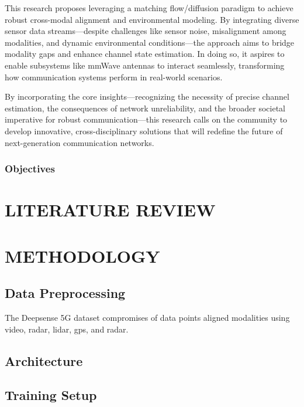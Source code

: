 \documentclass{UCF_ETD}
\begin{document}
This research proposes leveraging a matching flow/diffusion paradigm to achieve robust cross-modal alignment and environmental modeling. By integrating diverse sensor data streams—despite challenges like sensor noise, misalignment among modalities, and dynamic environmental conditions—the approach aims to bridge modality gaps and enhance channel state estimation. In doing so, it aspires to enable subsystems like mmWave antennas to interact seamlessly, transforming how communication systems perform in real-world scenarios.

By incorporating the core insights—recognizing the necessity of precise channel estimation, the consequences of network unreliability, and the broader societal imperative for robust communication—this research calls on the community to develop innovative, cross-disciplinary solutions that will redefine the future of next-generation communication networks.

\subsection{Objectives}


\chapter{LITERATURE REVIEW}




\chapter{METHODOLOGY}
\section{Data Preprocessing}
The Deepsense 5G dataset compromises of data points aligned modalities using video, radar, lidar, gps, and radar.

\section{Architecture}

\section{Training Setup}
\end{document}
